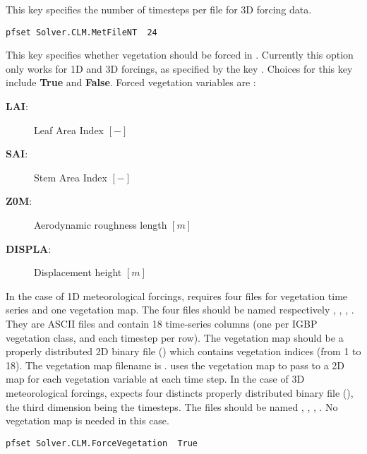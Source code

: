 {This key specifies the number of timesteps per file for 3D forcing data. 
}
\begin{display}\begin{verbatim}
pfset Solver.CLM.MetFileNT	24	
\end{verbatim}\end{display}

{This key specifies whether vegetation should be forced in . Currently this option only works for 1D and 3D forcings, as specified by the key . Choices for this key include {\bf True} and {\bf False}. Forced vegetation variables are :
\begin{description}
\item[{\bf LAI}: ] Leaf Area Index $[-]$
\item[{\bf SAI}: ] Stem Area Index $[-]$
\item[{\bf Z0M}: ] Aerodynamic roughness length $[m]$
\item[{\bf DISPLA}: ] Displacement height $[m]$
\label{clm_forcing}
\end{description}
In the case of 1D meteorological forcings,  requires four files for vegetation time series and one vegetation map. The four files should be named respectively , , , . They are ASCII files and contain 18 time-series columns (one per IGBP vegetation class, and each timestep per row). The vegetation map should be a properly distributed 2D \parflow{} binary file () which contains vegetation indices (from 1 to 18). The vegetation map filename is . \parflow{} uses the vegetation map to pass to  a 2D map for each vegetation variable at each time step. 
In the case of 3D meteorological forcings, \parflow{} expects four distincts properly distributed \parflow{} binary file (), the third dimension being the timesteps. The files should be named , , , . No vegetation map is needed in this case.
}
\begin{display}\begin{verbatim}
pfset Solver.CLM.ForceVegetation  True
\end{verbatim}\end{display}

